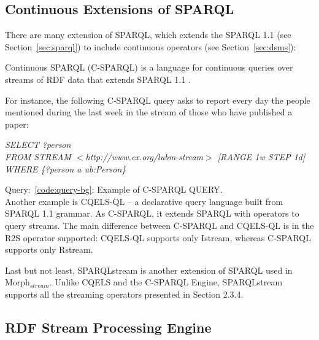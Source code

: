 \subsection{Continuous Extensions of SPARQL}\label{sec:continuous-sparql}

There are many extension of SPARQL, which extends the SPARQL 1.1 (see Section~\ref{sec:sparql}) to include continuous operators (see Section~\ref{sec:dsms}):

Continuous SPARQL (C-SPARQL)  is a language for continuous queries over streams of RDF data that extends SPARQL 1.1 \cite{Barbieri:2010:QRS:1860702.1860705}.

For instance, the following C-SPARQL query asks to report every day the people mentioned during the last week in the stream of those who have published a paper:

\begin{center}
\raggedright
\textit{SELECT ?person}\\
\textit{FROM STREAM $<$http://www.ex.org/lubm-stream$>$ [RANGE 1w STEP 1d]}\\
\textit{WHERE \{?person a ub:Person\}}\\
\label{code:query-bg}
\end{center}
Query:~\ref{code:query-bg}: Example of C-SPARQL QUERY.\\

Another example is CQELS-QL \cite{Lephuoc2011} – a declarative query language built from SPARQL 1.1 grammar. As C-SPARQL, it extends SPARQL with operators to query streams. The main difference between C-SPARQL and CQELS-QL is in the R2S operator supported: CQELS-QL supports only Istream, whereas C-SPARQL supports only Rstream. 

Last but not least, SPARQLstream \cite{Calbimonte:2010:EOA:1940281.1940289} is another extension of SPARQL used in Morph$_{stream}$. Unlike CQELS and the C-SPARQL Engine, SPARQLstream supports all the streaming operators presented in Section 2.3.4. 

\subsection{RDF Stream Processing Engine}\label{sec:rspengine}

